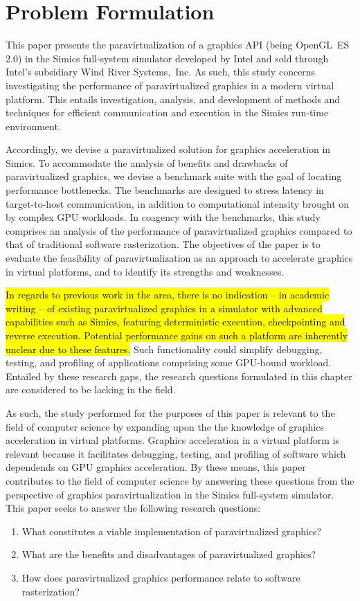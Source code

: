 
\section{Problem Formulation}
\label{sec:problemformulation}
This paper presents the paravirtualization of a graphics API (being OpenGL~ES~$2.0$) in the Simics full-system simulator developed by Intel and sold through Intel's subsidiary Wind River Systems,~Inc. 
As such, this study concerns investigating the performance of paravirtualized graphics in a modern virtual platform.
This entails investigation, analysis, and development of methods and techniques for efficient communication and execution in the Simics run-time environment.

Accordingly, we devise a paravirtualized solution for graphics acceleration in Simics.
To accommodate the analysis of benefits and drawbacks of paravirtualized graphics, we devise a benchmark suite with the goal of locating performance bottlenecks.
The benchmarks are designed to stress latency in target-to-host communication, in addition to computational intensity brought on by complex GPU workloads.
In coagency with the benchmarks, this study comprises an analysis of the performance of paravirtualized graphics compared to that of traditional software rasterization.
The objectives of the paper is to evaluate the feasibility of paravirtualization as an approach to accelerate graphics in virtual platforms, and to identify its strengths and weaknesses.

\hl{In regards to previous work in the area, there is no indication -- in academic writing -- of existing paravirtualized graphics in a simulator with advanced capabilities such as Simics, featuring deterministic execution, checkpointing and reverse execution.
Potential performance gains on such a platform are inherently unclear due to these features.}
Such functionality could simplify debugging, testing, and profiling of applications comprising some GPU-bound workload.
Entailed by these research gaps, the research questions formulated in this chapter are considered to be lacking in the field.

As such, the study performed for the purposes of this paper is relevant to the field of computer science by expanding upon the the knowledge of graphics acceleration in virtual platforms. Graphics acceleration in a virtual platform is relevant because it facilitates debugging, testing, and profiling of software which dependends on GPU graphics acceleration.
By these means, this paper contributes to the field of computer science by answering these questions from the perspective of graphics paravirtualization in the Simics full-system simulator.
This paper seeks to answer the following research questions:

\begin{enumerate}
  \item What constitutes a viable implementation of paravirtualized graphics?
  \item What are the benefits and disadvantages of paravirtualized graphics?
  \item How does paravirtualized graphics performance relate to software rasterization?
\end{enumerate}

